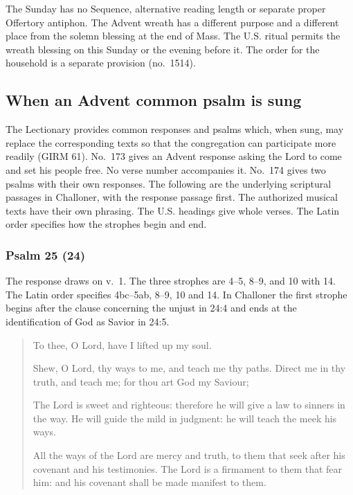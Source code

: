 The Sunday has no Sequence, alternative reading length or separate proper Offertory antiphon. The Advent wreath has a different purpose and a different place from the solemn blessing at the end of Mass. The U.S. ritual permits the wreath blessing on this Sunday or the evening before it. The order for the household is a separate provision (no.~1514).

\subsection{When an Advent common psalm is sung}

The Lectionary provides common responses and psalms which, when sung, may replace the corresponding texts so that the congregation can participate more readily (GIRM 61). No.~173 gives an Advent response asking the Lord to come and set his people free. No verse number accompanies it. No.~174 gives two psalms with their own responses. The following are the underlying scriptural passages in Challoner, with the response passage first. The authorized musical texts have their own phrasing. The U.S. headings give whole verses. The Latin order specifies how the strophes begin and end.

\subsubsection{Psalm 25 (24)}

The response draws on v.~1. The three strophes are 4--5, 8--9, and 10 with 14. The Latin order specifies 4bc--5ab, 8--9, 10 and 14. In Challoner the first strophe begins after the clause concerning the unjust in 24:4 and ends at the identification of God as Savior in 24:5.

\begin{quote}
To thee, O Lord, have I lifted up my soul.

Shew, O Lord, thy ways to me, and teach me thy paths. Direct me in thy truth, and teach me; for thou art God my Saviour;

The Lord is sweet and righteous: therefore he will give a law to sinners in the way. He will guide the mild in judgment: he will teach the meek his ways.

All the ways of the Lord are mercy and truth, to them that seek after his covenant and his testimonies. The Lord is a firmament to them that fear him: and his covenant shall be made manifest to them.
\end{quote}

